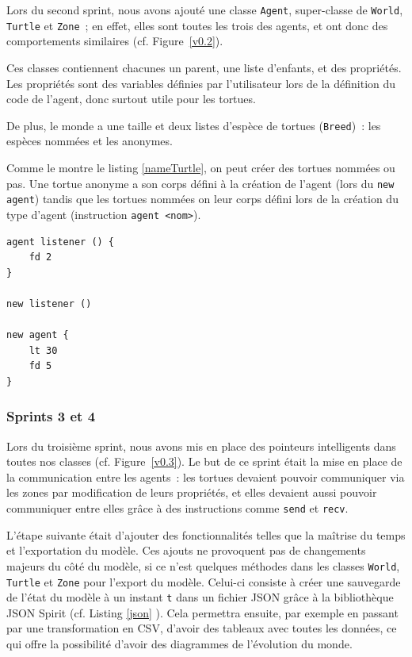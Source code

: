 Lors du second sprint, nous avons ajouté une classe \verb|Agent|, super-classe de \verb|World|, \verb|Turtle| et \verb|Zone|~; en effet, elles sont toutes les trois des agents, et ont donc des comportements similaires (cf. Figure~\ref{v0.2}).

Ces classes contiennent chacunes un parent, une liste d'enfants, et des propriétés. Les propriétés sont des variables définies par l'utilisateur lors de la définition du code de l'agent, donc surtout utile pour les tortues.

De plus, le monde a une taille et deux listes d'espèce de tortues (\verb|Breed|)~: les espèces nommées et les anonymes.

Comme le montre le listing \ref{nameTurtle}, on peut créer des tortues nommées ou pas. Une tortue anonyme a son corps défini à la création de l'agent (lors du \verb|new agent|) tandis que les tortues nommées on leur corps défini lors de la création du type d'agent (instruction \verb|agent <nom>|).

\begin{lstlisting}[language=Stibbons,label=nameTurtle,caption=Nommage lors de la création d'une tortue]
agent listener () {
	fd 2
}

new listener ()

new agent {
	lt 30
	fd 5
}
\end{lstlisting}

\subsubsection{Sprints 3 et 4}
Lors du troisième sprint, nous avons mis en place des pointeurs intelligents dans toutes nos classes (cf. Figure~\ref{v0.3}). Le but de ce sprint était la mise en place de la communication entre les agents~: les tortues devaient pouvoir communiquer via les zones par modification de leurs propriétés, et elles devaient aussi pouvoir communiquer entre elles grâce à des instructions comme \verb|send| et \verb|recv|.

L'étape suivante était d'ajouter des fonctionnalités telles que la maîtrise du temps et l'exportation du modèle. Ces ajouts ne provoquent pas de changements majeurs du côté du modèle, si ce n'est quelques méthodes dans les classes \verb|World|, \verb|Turtle| et \verb|Zone| pour l'export du modèle.
Celui-ci consiste à créer une sauvegarde de l'état du modèle à un instant \verb|t| dans un fichier JSON grâce à la bibliothèque JSON Spirit (cf. Listing \ref{json} ).
Cela permettra ensuite, par exemple en passant par une transformation en CSV, d'avoir des tableaux avec toutes les données, ce qui offre la possibilité d'avoir des diagrammes de l'évolution du monde.

